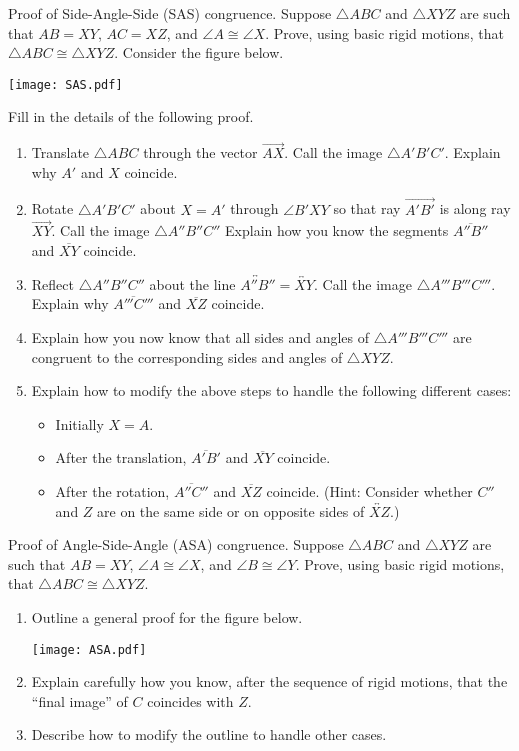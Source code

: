 \documentclass{ximera}
\begin{document}
\begin{problem}
Proof of Side-Angle-Side (SAS) congruence.  Suppose $\triangle ABC$ and $\triangle XYZ$ are such that $AB=XY$, $AC=XZ$, and $\angle A \cong \angle X$.  Prove, using basic rigid motions, that $\triangle ABC \cong \triangle XYZ$.  Consider the figure below.  
\begin{image}
\texttt{[image: SAS.pdf]}
\end{image}
Fill in the details of the following proof.  
\begin{enumerate}
\item Translate $\triangle ABC$ through the vector $\overrightarrow{AX}$.  Call the image $\triangle A'B'C'$.  Explain why $A'$ and $X$ coincide.
\item Rotate $\triangle A'B'C'$ about $X=A'$ through $\angle B'XY$ so that ray $\overrightarrow{A'B'}$ is along ray $\overrightarrow{XY}$.  Call the image $\triangle A''B''C''$   Explain how you know the segments $\overline{A''B''}$ and $\overline{XY}$ coincide. 
\item Reflect $\triangle A''B''C''$ about the line $\overleftrightarrow{A''B''} = \overleftrightarrow{XY}$.  Call the image $\triangle A'''B'''C'''$.  Explain why $\overline{A'''C'''}$ and $\overline{XZ}$ coincide.
\item Explain how you now know that all sides and angles of $\triangle A'''B'''C'''$ are congruent to the corresponding sides and angles of $\triangle XYZ$.  
\item Explain how to modify the above steps to handle the following different cases: 
\begin{itemize}
\item Initially $X = A$. 
\item After the translation, $\overline{A'B'}$ and $\overline{XY}$ coincide. 
\item After the rotation, $\overline{A''C''}$ and $\overline{XZ}$ coincide.  (Hint:  Consider whether $C''$ and $Z$ are on the same side or on opposite sides of $\overleftrightarrow{XZ}$.)  
\end{itemize}
\end{enumerate}
\end{problem}

\begin{problem}
Proof of Angle-Side-Angle (ASA) congruence.  Suppose $\triangle ABC$ and $\triangle XYZ$ are such that $AB=XY$, $\angle A \cong \angle X$, and $\angle B \cong \angle Y$.  Prove, using basic rigid motions, that $\triangle ABC \cong \triangle XYZ$.  
\begin{enumerate}
\item Outline a general proof for the figure below.  
\begin{image}
\texttt{[image: ASA.pdf]}
\end{image}
\item Explain carefully how you know, after the sequence of rigid motions, that the ``final image'' of $C$ coincides with $Z$.  
\item Describe how to modify the outline to handle other cases. 
\end{enumerate}
\end{problem}
\end{document}
